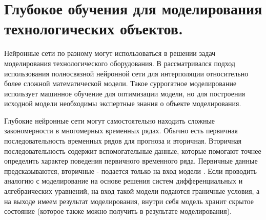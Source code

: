 \documentclass[12pt,a4paper]{article}
\begin{document}
\section{Глубокое обучения для моделирования технологических объектов.}

Нейронные сети по разному могут использоваться в решении задач моделирования технологического оборудования. В \cite{Shabunin} рассматривался подход использования полносвязной нейронной сети для интерполяции относительно более сложной математической модели. Такое суррогатное моделирование использует машинное обучение для оптимизации модели, но для построения исходной модели необходимы экспертные знания о объекте моделирования.    


Глубокие нейронные сети могут самостоятельно находить сложные закономерности в многомерных временных рядах. Обычно есть первичная последовательность временных рядов для прогноза и вторичная. Вторичная последовательность содержит вспомогательные данные, которые помогают точнее определить характер поведения первичного временного ряда. Первичные данные предсказываются, вторичные - подается только на вход модели \cite{Gribin}. Если проводить аналогию с моделирование на основе решения систем дифференциальных и алгебраических уравнений, на вход такой модели подаются граничные условия, а на выходе имеем результат моделирования, внутри себя модель хранит скрытое состояние (которое также можно получить в результате моделирования).


%
\end{document}
